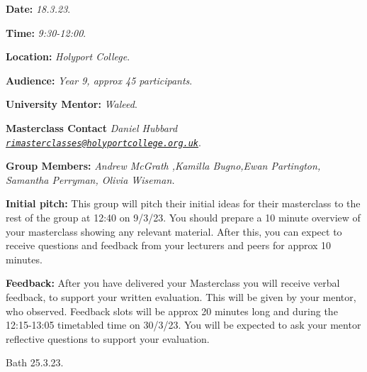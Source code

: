 \documentclass[
]{book}
\newenvironment{information}{
  \definecolor{shadecolor}{rgb}{0.8, 0.9,1.0}
  \definecolor{text-colour}{rgb}{0, 0.25, 0.52}
  \color{text-colour}
  \begin{shaded}}
 {\end{shaded}}
\begin{document}
\begin{information}
\textbf{Date:} \emph{18.3.23}.

\textbf{Time:} \emph{9:30-12:00}.

\textbf{Location:} \emph{Holyport College}.

\textbf{Audience:} \emph{Year 9, approx 45 participants}.

\textbf{University Mentor:} \emph{Waleed}.

\textbf{Masterclass Contact} \emph{Daniel Hubbard \href{mailto:rimasterclasses@holyportcollege.org.uk}{\nolinkurl{rimasterclasses@holyportcollege.org.uk}}}.

\textbf{Group Members:} \emph{Andrew McGrath ,Kamilla Bugno,Ewan Partington, Samantha Perryman, Olivia Wiseman.}

\textbf{Initial pitch:} This group will pitch their initial ideas for their masterclass to the rest of the group at 12:40 on 9/3/23. You should prepare a 10 minute overview of your masterclass showing any relevant material. After this, you can expect to receive questions and feedback from your lecturers and peers for approx 10 minutes.

\textbf{Feedback:} After you have delivered your Masterclass you will receive verbal feedback, to support your written evaluation. This will be given by your mentor, who observed. Feedback slots will be approx 20 minutes long and during the 12:15-13:05 timetabled time on 30/3/23. You will be expected to ask your mentor reflective questions to support your evaluation.

\end{information}

Bath 25.3.23.
\end{document}
